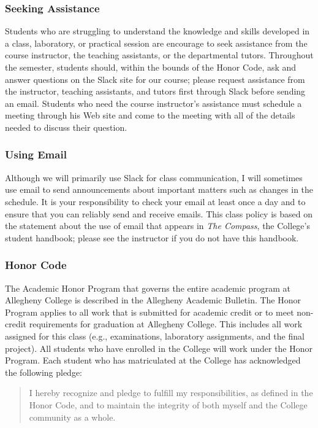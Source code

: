 \subsubsection*{Seeking Assistance}

Students who are struggling to understand the knowledge and skills developed in a class, laboratory, or practical
session are encourage to seek assistance from the course instructor, the teaching assistants, or the departmental
tutors. Throughout the semester, students should, within the bounds of the Honor Code, ask and answer questions on the
Slack site for our course; please request assistance from the instructor, teaching assistants, and tutors first through
Slack before sending an email. Students who need the course instructor's assistance must schedule a meeting through his
Web site and come to the meeting with all of the details needed to discuss their question.

\subsubsection*{Using Email}

Although we will primarily use Slack for class communication, I will sometimes use email to send announcements about
important matters such as changes in the schedule. It is your responsibility to check your email at least once a day and to
ensure that you can reliably send and receive emails. This class policy is based on the statement about the use of email that
appears in {\em The Compass}, the College's student handbook; please see the instructor if you do not have this
handbook.

\subsubsection*{Honor Code}

The Academic Honor Program that governs the entire academic program at Allegheny College is described in the Allegheny
Academic Bulletin.  The Honor Program applies to all work that is submitted for academic credit or to meet non-credit
requirements for graduation at Allegheny College.  This includes all work assigned for this class (e.g., examinations,
  laboratory assignments, and the final project).  All students who have enrolled in the College will work under the Honor
Program.  Each student who has matriculated at the College has acknowledged the following pledge:

\vspace*{-.11in}
\begin{quote}
  I hereby recognize and pledge to fulfill my responsibilities, as defined in the Honor Code, and to maintain the
  integrity of both myself and the College community as a whole.
\end{quote}
\vspace*{-.11in}

